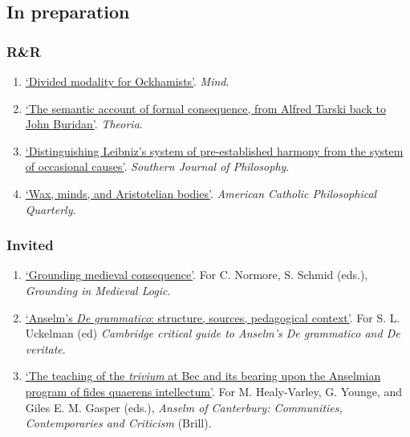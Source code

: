 \subsection{In preparation}
\subsubsection{R\&R}
\begin{enumerate}
	\setcounter{enumi}{\value{publicationCounter}}	%
	\item \datedsubsectionnarrow{}
	{}
	{
		\href{}{`Divided modality for Ockhamists'}. \emph{Mind}.}
	{}
	\item \datedsubsectionnarrow{}
{}
{
	\href{}{`The semantic account of formal consequence, from Alfred Tarski back to John Buridan'}. \emph{Theoria}.}
{}
	\item \datedsubsectionnarrow{}
{}
{
	\href{}{`Distinguishing Leibniz's system of pre-established harmony from the system of occasional causes'}. \emph{Southern Journal of Philosophy}.}
{}
	\item \datedsubsectionnarrow{}
{}
{
	\href{}{`Wax, minds, and Aristotelian bodies'}. \emph{American Catholic Philosophical Quarterly}.}
{}
	\setcounter{publicationCounter}{\value{enumi}}	%
\end{enumerate}
\subsubsection{Invited}
\begin{enumerate}
	\setcounter{enumi}{\value{publicationCounter}}	%
	\item \datedsubsectionnarrow{}
	{}
	{
		\href{}{`Grounding medieval consequence'}. For C. Normore, S. Schmid (eds.), \emph{Grounding in Medieval Logic}.}
	{}
	\item \datedsubsectionnarrow{}
	{}
	{
		\href{}{`Anselm's \emph{De grammatico}: structure, sources, pedagogical context'}. For S. L. Uckelman (ed) \emph{Cambridge critical guide to Anselm's De grammatico and De veritate}.}
	{}
	\item \datedsubsectionnarrow{}
	{}
	{
		\href{}{`The teaching of the \emph{trivium} at Bec and its bearing upon the Anselmian program of {fides quaerens intellectum}'}. For M. Healy-Varley, G. Younge, and Giles E. M. Gasper (eds.), \emph{Anselm of Canterbury: Communities, Contemporaries and Criticism} (Brill).}
	{}
	\setcounter{publicationCounter}{\value{enumi}}	%
\end{enumerate}
